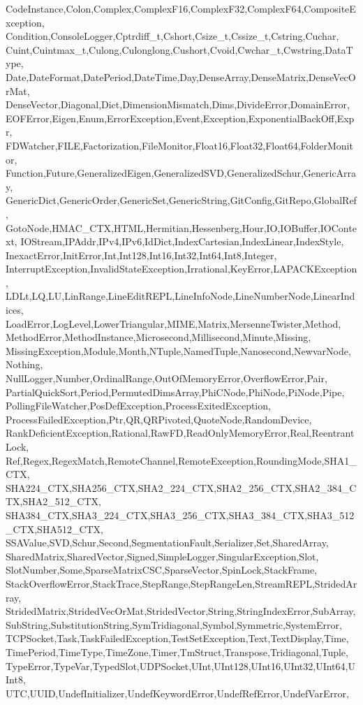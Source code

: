 {{CodeInstance,Colon,Complex,ComplexF16,ComplexF32,ComplexF64,CompositeException,%
Condition,ConsoleLogger,Cptrdiff_t,Cshort,Csize_t,Cssize_t,Cstring,Cuchar,%
Cuint,Cuintmax_t,Culong,Culonglong,Cushort,Cvoid,Cwchar_t,Cwstring,DataType,%
Date,DateFormat,DatePeriod,DateTime,Day,DenseArray,DenseMatrix,DenseVecOrMat,%
DenseVector,Diagonal,Dict,DimensionMismatch,Dims,DivideError,DomainError,%
EOFError,Eigen,Enum,ErrorException,Event,Exception,ExponentialBackOff,Expr,%
FDWatcher,FILE,Factorization,FileMonitor,Float16,Float32,Float64,FolderMonitor,%
Function,Future,GeneralizedEigen,GeneralizedSVD,GeneralizedSchur,GenericArray,%
GenericDict,GenericOrder,GenericSet,GenericString,GitConfig,GitRepo,GlobalRef,%
GotoNode,HMAC_CTX,HTML,Hermitian,Hessenberg,Hour,IO,IOBuffer,IOContext,%
IOStream,IPAddr,IPv4,IPv6,IdDict,IndexCartesian,IndexLinear,IndexStyle,%
InexactError,InitError,Int,Int128,Int16,Int32,Int64,Int8,Integer,%
InterruptException,InvalidStateException,Irrational,KeyError,LAPACKException,%
LDLt,LQ,LU,LinRange,LineEditREPL,LineInfoNode,LineNumberNode,LinearIndices,%
LoadError,LogLevel,LowerTriangular,MIME,Matrix,MersenneTwister,Method,%
MethodError,MethodInstance,Microsecond,Millisecond,Minute,Missing,%
MissingException,Module,Month,NTuple,NamedTuple,Nanosecond,NewvarNode,Nothing,%
NullLogger,Number,OrdinalRange,OutOfMemoryError,OverflowError,Pair,%
PartialQuickSort,Period,PermutedDimsArray,PhiCNode,PhiNode,PiNode,Pipe,%
PollingFileWatcher,PosDefException,ProcessExitedException,%
ProcessFailedException,Ptr,QR,QRPivoted,QuoteNode,RandomDevice,%
RankDeficientException,Rational,RawFD,ReadOnlyMemoryError,Real,ReentrantLock,%
Ref,Regex,RegexMatch,RemoteChannel,RemoteException,RoundingMode,SHA1_CTX,%
SHA224_CTX,SHA256_CTX,SHA2_224_CTX,SHA2_256_CTX,SHA2_384_CTX,SHA2_512_CTX,%
SHA384_CTX,SHA3_224_CTX,SHA3_256_CTX,SHA3_384_CTX,SHA3_512_CTX,SHA512_CTX,%
SSAValue,SVD,Schur,Second,SegmentationFault,Serializer,Set,SharedArray,%
SharedMatrix,SharedVector,Signed,SimpleLogger,SingularException,Slot,%
SlotNumber,Some,SparseMatrixCSC,SparseVector,SpinLock,StackFrame,%
StackOverflowError,StackTrace,StepRange,StepRangeLen,StreamREPL,StridedArray,%
StridedMatrix,StridedVecOrMat,StridedVector,String,StringIndexError,SubArray,%
SubString,SubstitutionString,SymTridiagonal,Symbol,Symmetric,SystemError,%
TCPSocket,Task,TaskFailedException,TestSetException,Text,TextDisplay,Time,%
TimePeriod,TimeType,TimeZone,Timer,TmStruct,Transpose,Tridiagonal,Tuple,%
TypeError,TypeVar,TypedSlot,UDPSocket,UInt,UInt128,UInt16,UInt32,UInt64,UInt8,%
UTC,UUID,UndefInitializer,UndefKeywordError,UndefRefError,UndefVarError,%
}}
